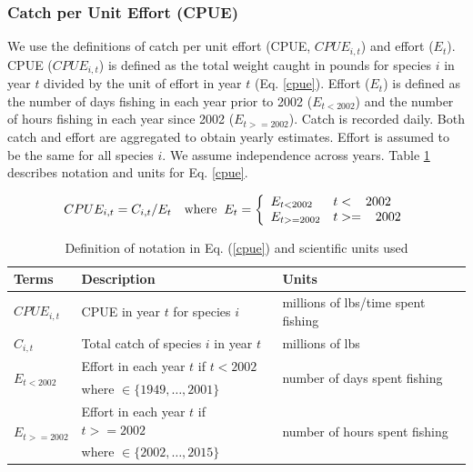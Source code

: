 \documentclass[oneside,12pt,final]{sty/ucthesis-CA2012}
\begin{document}
\begin{mainmatter}
\subsubsection{Catch per Unit Effort (CPUE)}
We use the \citet{langseth2018stock} definitions of catch per unit effort (CPUE, $CPUE_{i,t}$) and effort ($E_t$). CPUE ($CPUE_{i,t}$) is defined as the total weight caught in pounds for species $i$ in year $t$ divided by the unit of effort in year $t$ (Eq. \ref{cpue}). Effort ($E_t$) is defined as the number of days fishing in each year prior to 2002 ($E_{t<2002}$) and the number of hours fishing in each year since 2002 ($E_{t>=2002} $). Catch is recorded daily. Both catch and effort are aggregated to obtain yearly estimates. Effort is assumed to be the same for all species $i$. We assume independence across years. Table \ref{cpue_table} describes notation and units for Eq. \ref{cpue}.

\begin{equation}  \label{cpue}
CPUE_{i,t} = C_{i,t}/E_t \quad \text{where} \hspace{2mm} E_t = \left\{ 
\begin{array}{ll}
E_{t<2002} & t< \hspace{2mm} \hspace{1mm}  2002 \\
E_{t>=2002} & t>= \hspace{2mm} \hspace{1mm} 2002 
\end{array}  \right. 
\end{equation}

\begin{table}[H]
\centering
\caption{Definition of notation in Eq. (\ref{cpue}) and scientific units used}
\begin{tabular}{l|l|l}
  \hline \small
 Terms & Description & Units  \\ 
   \hline     
   $CPUE_{i,t}$ & CPUE in year $t$ for species $i$ & millions of lbs/time spent fishing \\
   $C_{i,t}$ & Total catch of species $i$ in year $t$ & millions of lbs \\
      \multirow{2}{*}{$E_{t<2002}$} & Effort in each year $t$ if $t <2002$  &  \multirow{2}{*}{number of days spent fishing} \\
      & where $\in \{1949,\dots,2001\}$  &  \\
   \multirow{2}{*}{$E_{t>=2002}$} & Effort in each year $t$ if $t >= 2002$ & \multirow{2}{*}{number of hours spent fishing} \\
       & where $\in \{2002,\dots,2015\}$ &  \\
   \hline
\end{tabular} 
\label{cpue_table}
\end{table}


\end{mainmatter}
\end{document}
